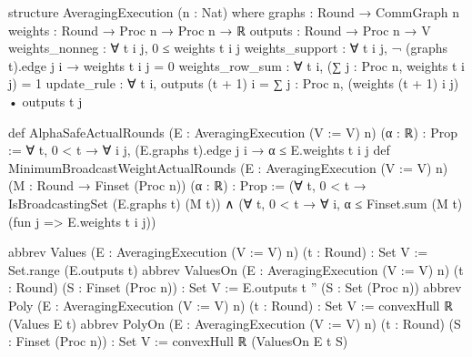 \begin{leanlisting}
\begin{leancode}
structure AveragingExecution (n : Nat) where
  graphs : Round → CommGraph n
  weights : Round → Proc n → Proc n → ℝ
  outputs : Round → Proc n → V
  weights_nonneg :
    ∀ t i j, 0 ≤ weights t i j
  weights_support :
    ∀ t i j, ¬ (graphs t).edge j i → weights t i j = 0
  weights_row_sum :
    ∀ t i, (∑ j : Proc n, weights t i j) = 1
  update_rule :
    ∀ t i, outputs (t + 1) i = ∑ j : Proc n, (weights (t + 1) i j) • outputs t j
\end{leancode}
\begin{leancode}
def AlphaSafeActualRounds (E : AveragingExecution (V := V) n) (α : ℝ) : Prop :=
  ∀ t, 0 < t → ∀ i j, (E.graphs t).edge j i → α ≤ E.weights t i j
def MinimumBroadcastWeightActualRounds (E : AveragingExecution (V := V) n)
    (M : Round → Finset (Proc n)) (α : ℝ) : Prop :=
  (∀ t, 0 < t → IsBroadcastingSet (E.graphs t) (M t)) ∧
    (∀ t, 0 < t → ∀ i, α ≤ Finset.sum (M t) (fun j => E.weights t i j))
\end{leancode}
\begin{leancode}
abbrev Values (E : AveragingExecution (V := V) n) (t : Round) : Set V :=
  Set.range (E.outputs t)
abbrev ValuesOn
    (E : AveragingExecution (V := V) n) (t : Round)
    (S : Finset (Proc n)) : Set V :=
  E.outputs t '' (S : Set (Proc n))
abbrev Poly (E : AveragingExecution (V := V) n) (t : Round) : Set V :=
  convexHull ℝ (Values E t)
abbrev PolyOn
    (E : AveragingExecution (V := V) n) (t : Round)
    (S : Finset (Proc n)) : Set V :=
  convexHull ℝ (ValuesOn E t S)
\end{leancode}
\end{leanlisting}

